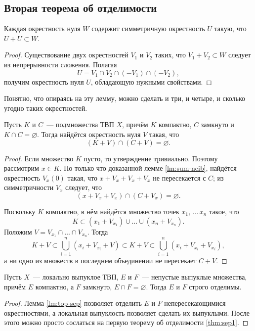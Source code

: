 \documentclass{notes}
\begin{document}
\subsection{Вторая теорема об отделимости}

	\begin{lm} \label{lm:sum-neib}
		Каждая окрестность нуля $W$ содержит симметричную окрестность $U$ такую, что $U + U \subset W$.
		\begin{proof}
			Существование двух окрестностей $V_1$ и $V_2$ таких, что $V_1 + V_2 \subset W$ следует из непрерывности сложения. Полагая
			\[
				U = V_1 \cap V_2 \cap (-V_1) \cap (-V_2),
			\]
			получим окрестность нуля $U$, обладающую нужными свойствами.
		\end{proof}
	\end{lm}

	\begin{rem}
		Понятно, что опираясь на эту лемму, можно сделать и три, и четыре, и сколько угодно таких окрестностей.
	\end{rem}

	\begin{lm} \label{lm:top-sep}
		Пусть $K$ и $C$~--- подмножества ТВП $X$, причём $K$ компактно, $C$ замкнуто и $K \cap C = \varnothing$. Тогда найдётся окрестность нуля $V$ такая, что
		\[
			(K + V) \cap (C + V) = \varnothing.
		\]
		\begin{proof}
			Если множество $K$ пусто, то утверждение тривиально. Поэтому рассмотрим $x \in K$. По только что доказанной лемме \ref{lm:sum-neib}, найдётся окрестность $V_x(0)$ такая, что $x + V_x + V_x + V_x$ не пересекается с $C$; из симметричности $V_x$ следует, что
			\[
				(x + V_x + V_x) \cap (C + V_x) = \varnothing.
			\]

			Поскольку $K$ компактно, в нём найдётся множество точек $x_1, \, \ldots\, x_n$ такое, что
			\[
				K \subset (x_1 + V_{x_1}) \cup \ldots \cup (x_n + V_{x_n}).
			\]
			Положим $V = V_{x_1} \cap \ldots \cap V_{x_n}$. Тогда
			\[
				K + V \subset \bigcup\limits_{i = 1}^n (x_i + V_{x_i} + V) \subset K + V \subset \bigcup\limits_{i = 1}^n (x_i + V_{x_i} + V_{x_i}),
			\]
			а ни одно из множеств в последнем объединении не пересекает $C + V$.
		\end{proof}
	\end{lm}

	\begin{thm} \label{thm:sep2}
		Пусть $X$~--- локально выпуклое ТВП, $E$ и $F$~--- непустые выпуклые множества, причём $E$ компактно, а $F$ замкнуто, $E \cap F = \varnothing$. Тогда $E$ и $F$ строго отделимы.
		\begin{proof}
			Лемма \ref{lm:top-sep} позволяет отделить $E$ и $F$ непересекающимися окрестностями, а локальная выпуклость позволяет сделать их выпуклыми. После этого можно просто сослаться на первую теорему об отделимости \ref{thm:sep1}.
		\end{proof}
	\end{thm}
\end{document}
